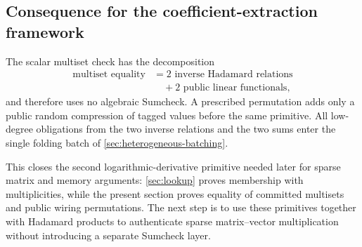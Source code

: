 \subsection{Consequence for the coefficient-extraction framework}
\label{sec:permutation-consequence}

The scalar multiset check has the decomposition
\begin{equation}
\begin{aligned}
  \text{multiset equality}
  &={}2\text{ inverse Hadamard relations}\\
  &\quad+2\text{ public linear functionals},
\end{aligned}
\label{eq:multiset-decomposition}
\end{equation}
and therefore uses no algebraic Sumcheck.  A prescribed permutation adds only a public random compression of tagged values before the same primitive.  All low-degree obligations from the two inverse relations and the two sums enter the single folding batch of \cref{sec:heterogeneous-batching}.

This closes the second logarithmic-derivative primitive needed later for sparse matrix and memory arguments: \cref{sec:lookup} proves membership with multiplicities, while the present section proves equality of committed multisets and public wiring permutations.  The next step is to use these primitives together with Hadamard products to authenticate sparse matrix--vector multiplication without introducing a separate Sumcheck layer.
